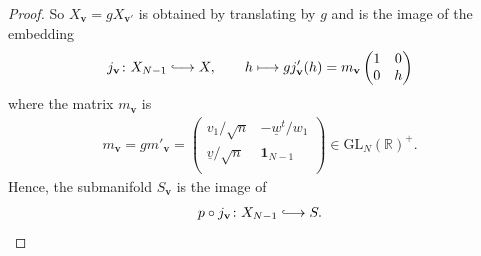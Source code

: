 \documentclass[10pt,a4paper]{amsart}
\newcommand{\GL}{\mathrm{GL}}
\newcommand{\R}{\mathbb{R}}
\newcommand{\hooklongrightarrow}{\lhook\joinrel\longrightarrow}
\newcommand{\id}{\mathbf{1}}
\newcommand{\vbf}{\mathbf{v}}
\newcommand{\vud}{\underline{v}}
\newcommand{\wud}{\underline{w}}
\begin{document}
\begin{proof}
So $X_{\vbf}=gX_{\vbf'}$ is obtained by translating by $g$ and is the image of the embedding
\begin{align}
    j_{\vbf} \colon X_{N-1} \hooklongrightarrow X, \qquad h \longmapsto gj'_\vbf(h)=m_\vbf\begin{pmatrix}
        1 & 0 \\ 0 & h
    \end{pmatrix}
\end{align}
where the matrix $m_\vbf$ is
\begin{align}
    m_{\vbf} = gm'_\vbf=\begin{pmatrix} 
    v_1/\sqrt{n} & -\wud^t/w_1 \\
 \vud/\sqrt{n} & \id_{N-1} \\
    \end{pmatrix} \in \GL_N(\R)^+.
\end{align}
Hence, the submanifold $S_\vbf$ is the image of
\begin{align}
    p \circ j_\vbf \colon X_{N-1} \hooklongrightarrow S. 
\end{align}
\end{proof}
\end{document}
